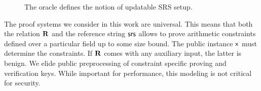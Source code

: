 \begin{figure}[t!]
	\centering
	\centerline{}
	\caption{The oracle defines the notion of updatable SRS setup.} 
		\label{fig:upd}
\end{figure}

 The proof systems we consider in this work are universal. This means that both the relation $\mathbf{R}$ and the reference string $\mathsf{srs}$ allows to prove arithmetic constraints defined over a particular field up to some size bound. The public instance $\mathsf{x}$ must determine the constraints. 
If $\mathbf{R}$ comes with any auxiliary input, the latter is benign. 
We elide public preprocessing of constraint specific proving and verification keys. While important for performance, this modeling is not critical for security.


